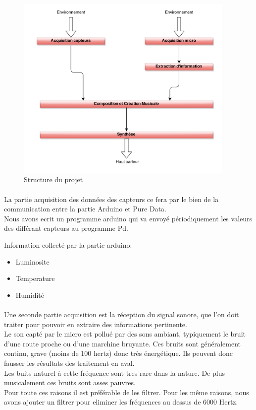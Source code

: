 \documentclass[a4paper, titlepage, oneside, 12pt]{article}%
\begin{document}
\begin{figure}
  \centering
  \includegraphics[width=400px]{structprojet.jpg}
  \caption{Structure du projet}
\end{figure}

\paragraph{}
La partie acquisition des données des capteurs ce fera par le bien de la communication entre la partie Arduino et Pure Data.\\
Nous avons ecrit un programme arduino qui va envoyé périodiquement les valeurs des différant capteurs au programme Pd.

Information collecté par la partie arduino:
\begin{itemize}
\item Luminosite
\item Temperature
\item Humidité
\end{itemize}

\paragraph{}
Une seconde partie acquisition est la réception du signal sonore, que l'on doit traiter pour pouvoir en extraire des informations pertinente.\\
Le son capté par le micro est pollué par des sons ambiant, typiquement le bruit d'une route proche ou d'une marchine bruyante. Ces bruits sont généralement continu, grave (moins  de 100 hertz) donc très énergétique. Ils peuvent donc fausser les résultats des traitement en aval.\\
 Les buits naturel à cette fréquence sont tres rare dans la nature. De plus musicalement ces bruits sont asses pauvres.\\
Pour toute ces raisons il est préférable de les filtrer. Pour les même raisons, nous avons ajouter un filtrer pour eliminer les fréquences au dessus de 6000 Hertz.
\end{document}
